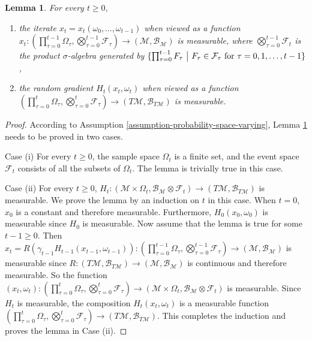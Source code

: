 \documentclass{amsart}
\newcommand{\fil}{\mathcal{F}}
\newcommand{\M}{\mathcal{M}}
\newcommand{\g}{\gamma}
\newcommand{\B}{\mathcal{B}}
\theoremstyle{plain}
\newtheorem{lemma}[theorem]{Lemma}
\theoremstyle{definition}
\theoremstyle{remark}
\numberwithin{theorem}{section}
\numberwithin{equation}{section}
\begin{document}
\begin{lemma}\label{lemma-measurability-deterministic}
For every $t\geq 0$, 
\begin{enumerate}
	\item the iterate $x_t=x_t(\omega_0,\dots,\omega_{t-1})$ when viewed as a function $x_t:(\prod_{\tau =0}^{t-1} \Omega_\tau, \bigotimes_{\tau =0}^{t-1} \fil_\tau) \rightarrow (\M, \B_{\M})$ is measurable, where $\bigotimes_{\tau =0}^{t-1} \fil_t$ is the product $\sigma$-algebra generated by $\{\prod_{\tau =0}^{t-1} F_\tau ~\big{|}~ F_\tau \in\fil_\tau \text{ for } \tau=0,1,\dots, t-1\}$,
	\item the random gradient $H_t(x_t,\omega_t)$ when viewed as a function $(\prod_{\tau =0}^{t} \Omega_\tau, \bigotimes_{\tau =0}^{t} \fil_\tau) \rightarrow (T\M, \B_{T\M})$ is measurable.
\end{enumerate}
\end{lemma}

\begin{proof}
According to Assumption \ref{assumption-probability-space-varying}, Lemma \ref{lemma-measurability-deterministic} needs to be proved in two cases.

Case (i) For every $t\geq 0$, the sample space $\Omega_t$ is a finite set, and the event space $\fil_t$ consists of all the subsets of $\Omega_t$. The lemma is trivially true in this case. 

Case (ii) For every $t\geq 0$, $H_t:(\M \times \Omega_t, \B_{\M}\otimes \fil_t) \rightarrow (T\M, \B_{T\M})$ is measurable. We prove the lemma by an induction on $t$ in this case. When $t=0$, $x_0$ is a constant and therefore measurable. Furthermore, $H_0(x_0,\omega_0)$ is measurable since $H_0$ is measurable. Now assume that the lemma is true for some $t-1\geq 0$. Then $x_{t}=R(\g_{t-1}H_{t-1}(x_{t-1},\omega_{t-1})): (\prod_{\tau =0}^{t-1} \Omega_\tau, \bigotimes_{\tau =0}^{t-1} \fil_\tau) \rightarrow (\M, \B_{\M})$ is measurable since $R:(T\M,\B_{T\M}) \rightarrow (\M,\B_{\M})$ is continuous and therefore measurable. So the function $(x_t,\omega_t): (\prod_{\tau =0}^{t} \Omega_\tau, \bigotimes_{\tau =0}^{t} \fil_\tau) \rightarrow (\M\times \Omega_t, \B_{\M}\otimes \fil_t)$ is measurable. Since $H_t$ is measurable, the composition $H_t(x_t,\omega_t)$ is a measurable function $(\prod_{\tau =0}^{t} \Omega_\tau, \bigotimes_{\tau =0}^{t} \fil_\tau) \rightarrow (T\M, \B_{T\M})$. This completes the induction and proves the lemma in Case (ii).
\end{proof}
\end{document}
